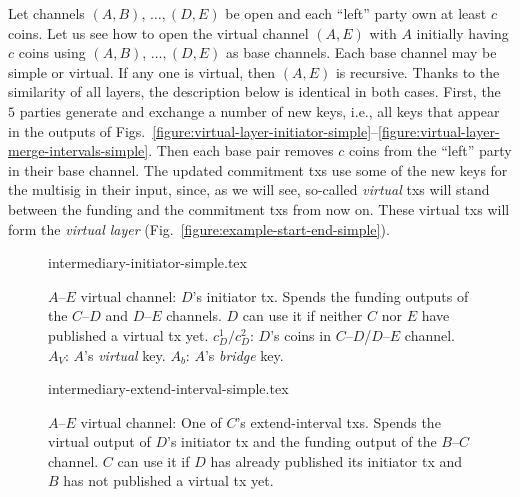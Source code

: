   Let channels $(A, B)$, $\dots,(D, E)$ be open and each ``left'' party own at
  least $c$ coins. Let us see how to open the virtual channel $(A, E)$ with $A$
  initially having $c$ coins using $(A, B)$, $\dots,(D, E)$ as base channels.
  Each base channel may be simple or virtual. If any one is virtual, then $(A,
  E)$ is recursive. Thanks to the similarity of all layers, the description
  below is identical in both cases. First, the $5$ parties generate and exchange
  a number of new
  keys, i.e., all keys that appear in the outputs of
  Figs.~\ref{figure:virtual-layer-initiator-simple}--\ref{figure:virtual-layer-merge-intervals-simple}. Then
  each base pair removes $c$ coins from the ``left'' party in
  their base channel. The updated commitment txs use some of the new
  keys for the multisig in their input, since, as we will see, so-called \emph{virtual}
  txs will stand between the funding and the commitment txs from now on. These
  virtual txs will form the \emph{virtual layer} (Fig.~\ref{figure:example-start-end-simple}).

  \addtolength{\intextsep}{-15pt}
  \begin{figure*}[!htbp]
    \begin{minipage}{.48\textwidth}
%
%
    {intermediary-initiator-simple.tex}
    \caption{$A$--$E$ virtual channel: $D$'s initiator tx. Spends the
    funding outputs of the $C$--$D$ and $D$--$E$ channels. $D$ can use it if neither
    $C$ nor $E$ have published a virtual tx yet. $c_D^1/c_D^2$: $D$'s coins
    in $C$--$D$/$D$--$E$ channel. $A_V$: $A$'s
    \emph{virtual} key. $A_b$: $A$'s \emph{bridge} key.}
    \label{figure:virtual-layer-initiator-simple}
%
    \end{minipage}\hspace{10pt}%
    \begin{minipage}{.49\textwidth}
%
%
    {intermediary-extend-interval-simple.tex}
    \caption{$A$--$E$ virtual channel: One of $C$'s extend-interval
    txs. Spends the virtual output of $D$'s
    initiator tx and the funding output of the $B$--$C$ channel. $C$ can
    use it if $D$ has already published its initiator tx and $B$ has
    not published a virtual tx yet.}
    \label{figure:virtual-layer-extend-interval-simple}
%
    \end{minipage}
  \end{figure*}
  \addtolength{\intextsep}{15pt}

